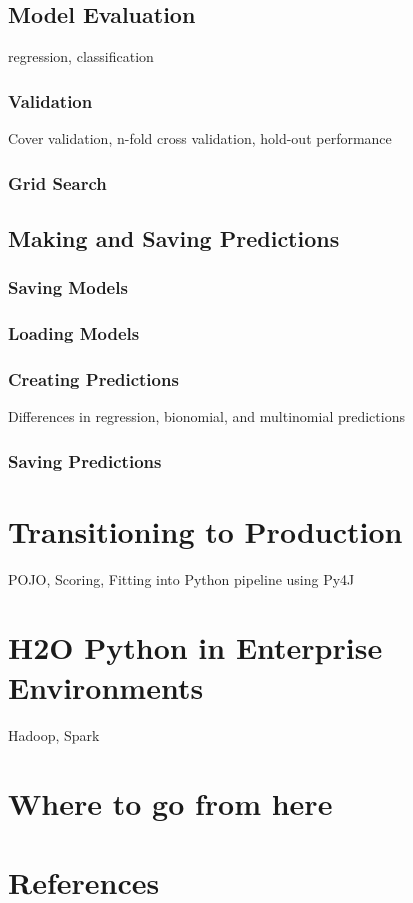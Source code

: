 \subsection{Model Evaluation}
regression, classification
\subsubsection{Validation}
Cover validation, n-fold cross validation, hold-out performance
\subsubsection{Grid Search}

\subsection{Making and Saving Predictions}
\subsubsection{Saving Models}
\subsubsection{Loading Models}
\subsubsection{Creating Predictions}
Differences in regression, bionomial, and multinomial predictions
\subsubsection{Saving Predictions}


\section{Transitioning to Production}
POJO, Scoring, Fitting into Python pipeline using Py4J


\section{H2O Python in Enterprise Environments}
Hadoop, Spark

\section{Where to go from here}


\newpage
\section{References}







\enddocument
